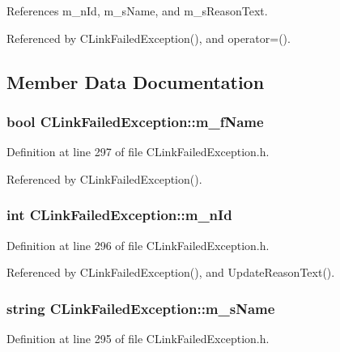 References m\_\-n\-Id, m\_\-s\-Name, and m\_\-s\-Reason\-Text.

Referenced by CLink\-Failed\-Exception(), and operator=().

\subsection{Member Data Documentation}
\subsubsection{\setlength{\rightskip}{0pt plus 5cm}bool CLink\-Failed\-Exception::m\_\-f\-Name\hspace{0.3cm}{\tt  [private]}}\label{classCLinkFailedException_o2}




Definition at line 297 of file CLink\-Failed\-Exception.h.

Referenced by CLink\-Failed\-Exception().
\subsubsection{\setlength{\rightskip}{0pt plus 5cm}int CLink\-Failed\-Exception::m\_\-n\-Id\hspace{0.3cm}{\tt  [private]}}\label{classCLinkFailedException_o1}




Definition at line 296 of file CLink\-Failed\-Exception.h.

Referenced by CLink\-Failed\-Exception(), and Update\-Reason\-Text().
\subsubsection{\setlength{\rightskip}{0pt plus 5cm}string CLink\-Failed\-Exception::m\_\-s\-Name\hspace{0.3cm}{\tt  [private]}}\label{classCLinkFailedException_o0}




Definition at line 295 of file CLink\-Failed\-Exception.h.

